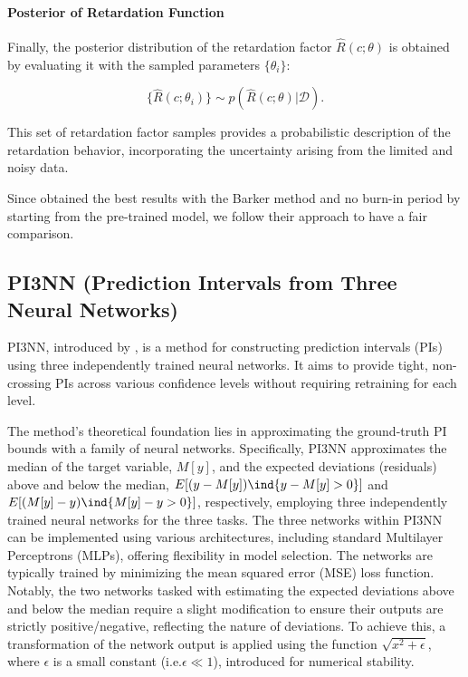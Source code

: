 \paragraph{Posterior of Retardation Function}

Finally, the posterior distribution of the retardation factor $\hat{R}(c;\theta)$ is obtained by evaluating it with the sampled parameters $\{\theta_i\}$:

\begin{equation*}
\{\hat{R}(c;\theta_i)\} \sim p(\hat{R}(c;\theta) | \mathcal{D}) .
\end{equation*}

This set of retardation factor samples provides a probabilistic description of the retardation behavior, incorporating the uncertainty arising from the limited and noisy data.

Since \textcite{finn} obtained the best results with the Barker method and no burn-in period by starting from the pre-trained model, we follow their approach to have a fair comparison.



\subsection{PI3NN (Prediction Intervals from Three Neural Networks)}
PI3NN, introduced by \textcite{pi3nn}, is a method for constructing prediction intervals (PIs) using three independently trained neural networks. It aims to provide tight, non-crossing PIs across various confidence levels without requiring retraining for each level.

The method's theoretical foundation lies in approximating the ground-truth PI bounds with a family of neural networks. Specifically, PI3NN approximates the median of the target variable, $M[y]$, and the expected deviations (residuals) above and below the median, $E[(y - M[y]) \ind{y-M[y]>0}]$ and $E[(M[y] - y) \ind{M[y]-y>0}]$, respectively, employing three independently trained neural networks for the three tasks.
The three networks within PI3NN can be implemented using various architectures, including standard Multilayer Perceptrons (MLPs), offering flexibility in model selection. The networks are typically trained by minimizing the mean squared error (MSE) loss function. Notably, the two networks tasked with estimating the expected deviations above and below the median require a slight modification to ensure their outputs are strictly positive/negative, reflecting the nature of deviations. To achieve this, a transformation of the network output is applied using the function $\sqrt{x^2 + \epsilon}$, where $\epsilon$ is a small constant (i.e.\@ $\epsilon \ll 1$), introduced for numerical stability.

